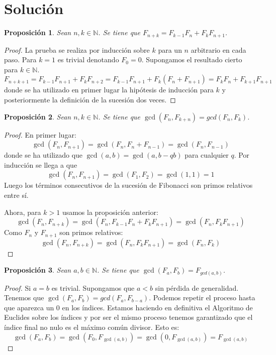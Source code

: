 \documentclass{article}
\theoremstyle{theorem-style}  %
\newtheorem{proposition}{Proposición}
\theoremstyle{definition}
\theoremstyle{example-style}
\begin{document}
\section*{Solución}

    \begin{proposition}
        Sean $n, k \in \mathbb{N}$. Se tiene que $F_{n+k} = F_{k-1}F_n + F_k F_{n+1}$. 
    \end{proposition}
    \begin{proof}
        La prueba se realiza por inducción sobre $k$ para un $n$ arbitrario en cada paso. Para $k=1$ es trivial denotando $F_0 = 0$. Supongamos el resultado cierto para $k \in \mathbb{N}$. 
        $$ F_{n+k+1} = F_{k-1}F_{n+1} + F_k F_{n+2} = F_{k-1}F_{n+1} + F_k (F_{n} + F_{n+1}) = F_{k}F_n + F_{k+1} F_{n+1} $$
        donde se ha utilizado en primer lugar la hipótesis de inducción para $k$ y posteriormente la definición de la sucesión dos veces.
    \end{proof}
    
    \begin{proposition}
        Sean $n, k \in \mathbb{N}$. Se tiene que $\gcd(F_n, F_{k+n}) = gcd(F_n, F_k)$. 
    \end{proposition}
    \begin{proof}
        En primer lugar: 
        $$ \gcd(F_n, F_{n+1}) = \gcd(F_{n}, F_{n}+F_{n-1}) = \gcd(F_{n}, F_{n-1}) $$
        donde se ha utilizado que $\gcd(a,b) = \gcd(a,b-qb)$ para cualquier $q$. Por inducción se llega a que 
        $$ \gcd(F_n, F_{n+1}) = \gcd(F_{1}, F_{2}) = \gcd(1,1) = 1 $$
        Luego los términos consecutivos de la sucesión de Fibonacci son primos relativos entre sí.
                
        Ahora, para $k > 1$ usamos la proposición anterior:
        $$ \gcd(F_n, F_{n+k}) = \gcd(F_n, F_{k-1}F_n + F_k F_{n+1}) = \gcd(F_n, F_k F_{n+1}) $$
        Como $F_n$ y $F_{n+1}$ son primos relativos:
        $$ \gcd(F_n, F_{n+k}) = \gcd(F_n, F_k F_{n+1}) = \gcd(F_n, F_k) $$
    \end{proof}
    
    \begin{proposition}
        Sean $a, b \in \mathbb{N}$. Se tiene que $\gcd(F_a, F_b) = F_{gcd(a, b)}$. 
    \end{proposition}
    \begin{proof}
        Si $a=b$ es trivial. Supongamos que $a < b$ sin pérdida de generalidad.
        Tenemos que $\gcd(F_a, F_b) = gcd(F_a, F_{b-a})$. Podemos repetir el proceso hasta que aparezca un 0 en los índices. Estamos haciendo en definitiva el Algoritmo de Euclides sobre los índices y por ser el mismo proceso tenemos garantizado que el índice final no nulo es el máximo común divisor. Esto es:
        $$ \gcd(F_a, F_b) = \gcd(F_0, F_{\gcd(a,b)}) = \gcd(0, F_{\gcd(a,b)}) = F_{\gcd(a,b)} $$
    \end{proof}
    
\end{document}
